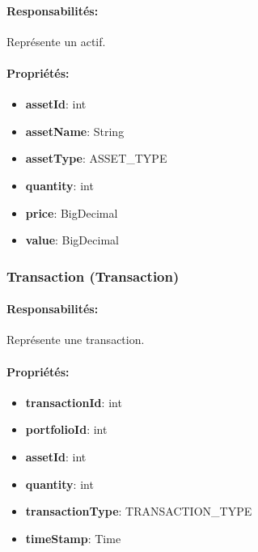 \documentclass{article}
\begin{document}
\paragraph{Responsabilités:} Représente un actif.
\paragraph{Propriétés:}
\begin{itemize}
  \item \textbf{assetId}: int
  \item \textbf{assetName}: String
  \item \textbf{assetType}: ASSET\_TYPE
  \item \textbf{quantity}: int
  \item \textbf{price}: BigDecimal
  \item \textbf{value}: BigDecimal
\end{itemize}
\subsubsection{Transaction (Transaction)}
\paragraph{Responsabilités:} Représente une transaction.
\paragraph{Propriétés:}
\begin{itemize}
  \item \textbf{transactionId}: int
  \item \textbf{portfolioId}: int
  \item \textbf{assetId}: int
  \item \textbf{quantity}: int
  \item \textbf{transactionType}: TRANSACTION\_TYPE
  \item \textbf{timeStamp}: Time
\end{itemize}
\end{document}
